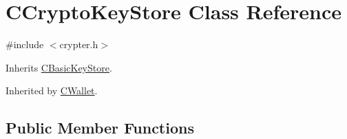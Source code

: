\hypertarget{class_c_crypto_key_store}{}\section{C\+Crypto\+Key\+Store Class Reference}
\label{class_c_crypto_key_store}


{\ttfamily \#include $<$crypter.\+h$>$}



Inherits \mbox{\hyperlink{class_c_basic_key_store}{C\+Basic\+Key\+Store}}.



Inherited by \mbox{\hyperlink{class_c_wallet}{C\+Wallet}}.

\subsection*{Public Member Functions}
